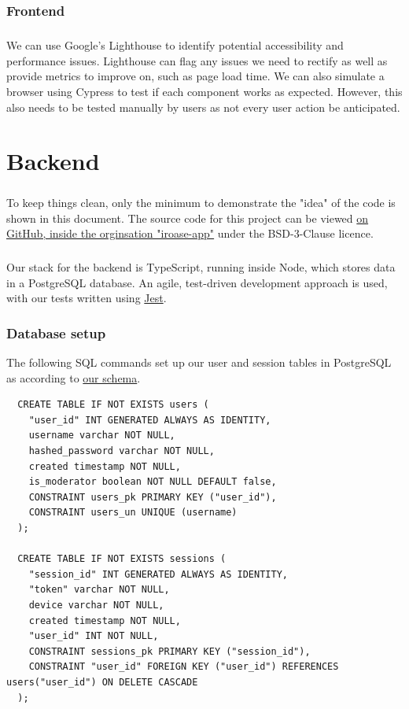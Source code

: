 \documentclass{report}
\begin{document}
\subsection{Frontend}
\paragraph{}
We can use Google's Lighthouse to identify potential accessibility and performance issues. Lighthouse can flag any issues we need to rectify as well as provide metrics to improve on, such as page load time. We can also simulate a browser using Cypress to test if each component works as expected. However, this also needs to be tested manually by users as not every user action be anticipated.

\chapter{Backend}
\paragraph{}
To keep things clean, only the minimum to demonstrate the "idea" of the code is shown in this document. The source code for this project can be viewed \href{https://github.com/iroase-app}{on GitHub, inside the orginsation "iroase-app"} under the BSD-3-Clause licence.

\paragraph{}
Our stack for the backend is TypeScript, running inside Node, which stores data in a PostgreSQL database. An agile, test-driven development approach is used, with our tests written using \href{https://jestjs.io}{Jest}.

\subsection{Database setup}
The following SQL commands set up our user and session tables in PostgreSQL as according to \hyperref[fig:database1]{our schema}.

\begin{verbatim}
  CREATE TABLE IF NOT EXISTS users (
    "user_id" INT GENERATED ALWAYS AS IDENTITY,
    username varchar NOT NULL,
    hashed_password varchar NOT NULL,
    created timestamp NOT NULL,
    is_moderator boolean NOT NULL DEFAULT false,
    CONSTRAINT users_pk PRIMARY KEY ("user_id"),
    CONSTRAINT users_un UNIQUE (username)
  );

  CREATE TABLE IF NOT EXISTS sessions (
    "session_id" INT GENERATED ALWAYS AS IDENTITY,
    "token" varchar NOT NULL,
    device varchar NOT NULL,
    created timestamp NOT NULL,
    "user_id" INT NOT NULL,
    CONSTRAINT sessions_pk PRIMARY KEY ("session_id"),
    CONSTRAINT "user_id" FOREIGN KEY ("user_id") REFERENCES users("user_id") ON DELETE CASCADE
  );
\end{verbatim}
\end{document}
